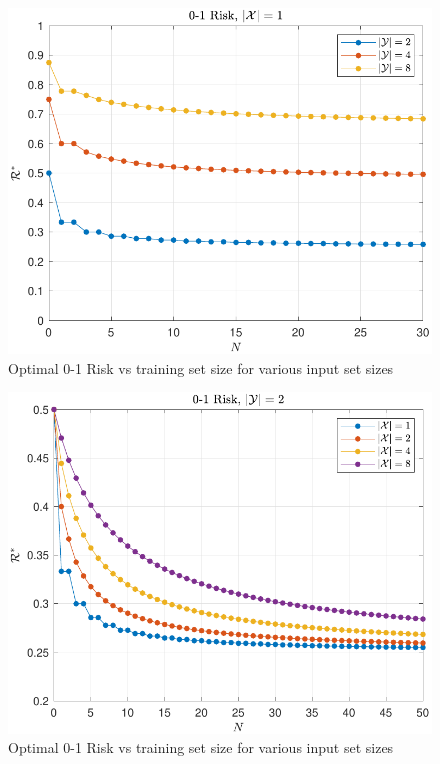 \documentclass[conference]{IEEEtran}
\DeclareMathOperator{\Xcal}{\mathcal{X}}
\begin{document}
\begin{figure}
\centering
\includegraphics[width=0.9\linewidth]{Risk_01_uni_N_leg_My.pdf}
\caption{Optimal 0-1 Risk vs training set size for various input set sizes}
\label{fig:Risk_01_uni_N_leg_My}
\end{figure}

\begin{figure}
\centering
\includegraphics[width=0.9\linewidth]{Risk_01_uni_N_leg_Mx.pdf}
\caption{Optimal 0-1 Risk vs training set size for various input set sizes}
\label{fig:Risk_01_uni_N_leg_Mx}
\end{figure}

%
\end{document}
